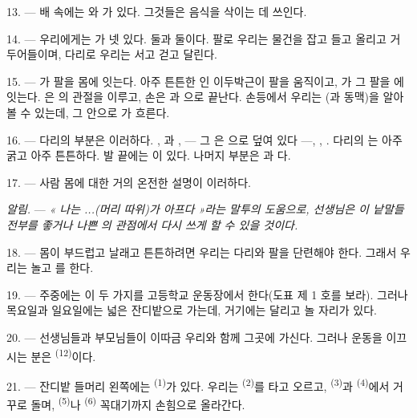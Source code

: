 13. --- 배 속에는 와 가 있다. 그것들은 음식을 삭이는 데 쓰인다.

\VUsaut{4.4mm}
\VUsaut{3.0mm}

14. --- 우리에게는 가 넷 있다.  둘과  둘이다.
팔로 우리는 물건을 잡고 들고 올리고 거두어들이며, 다리로 우리는 서고 걷고 달린다.

15. --- 가 팔을 몸에 잇는다. 아주 튼튼한 인 이두박근이 팔을
움직이고, 가 그 팔을 에 잇는다. 은
의 관절을 이루고, 손은 과 으로 끝난다. 손등에서
우리는 (과 동맥)을 알아볼 수 있는데, 그 안으로 가 흐른다.

16. --- 다리의 부분은 이러하다. , 과 ,
 — 그 은 으로 덮여 있다 —, ,
. 다리의 는 아주 굵고 아주 튼튼하다. 발 끝에는
이 있다. 나머지 부분은 과 다.

17. --- 사람 몸에 대한 거의 온전한 설명이 이러하다.

\textit{알림.} ---
\textit{« 나는 ...(머리 따위)가 아프다 »라는 말투의 도움으로, 선생님은 이 낱말들 전부를
좋거나 나쁜}  \textit{의 관점에서 다시 쓰게 할 수 있을 것이다.}

\VUsaut{5.0mm}
\VUsaut{2.4mm}
\VUsaut{3.0mm}

18. --- 몸이 부드럽고 날래고 튼튼하려면 우리는 다리와 팔을 단련해야 한다. 그래서 우리는
놀고 를 한다.

19. --- 주중에는 이 두 가지를 고등학교 운동장에서 한다(도표 제 1 호를 보라). 그러나
목요일과 일요일에는 넓은 잔디밭으로 가는데, 거기에는 달리고 놀 자리가 있다.

20. --- 선생님들과 부모님들이 이따금 우리와 함께 그곳에 가신다. 그러나 운동을 이끄시는
분은 \textsuperscript{(12)}이다.

21. --- 잔디밭 들머리 왼쪽에는 \textsuperscript{(1)}가 있다. 우리는
\textsuperscript{(2)}를 타고 오르고, \textsuperscript{(3)}과
\textsuperscript{(4)}에서 거꾸로 돌며, \textsuperscript{(5)}나
\textsuperscript{(6)} 꼭대기까지 손힘으로 올라간다.


